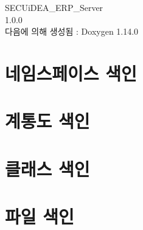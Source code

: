 \documentclass[twoside]{book}
\newcommand{\+}{\discretionary{\mbox{\scriptsize$\hookleftarrow$}}{}{}}
\newcommand{\clearemptydoublepage}{%
    \newpage{\pagestyle{empty}\cleardoublepage}%
  }
\begin{document}
  \raggedbottom
    \hypersetup{pageanchor=false,
                bookmarksnumbered=true,
                pdfencoding=unicode
               }
  \begin{titlepage}
  \vspace*{7cm}
  \begin{center}%
  {\Large SECUi\+DEA\+\_\+\+ERP\+\_\+\+Server}\\
  [1ex]\large 1.\+0.\+0 \\
  \vspace*{1cm}
  {\large 다음에 의해 생성됨 \+:  Doxygen 1.14.0}\\
  \end{center}
  \end{titlepage}
  \clearemptydoublepage
  \tableofcontents
  \clearemptydoublepage
  \hypersetup{pageanchor=true}






\chapter{네임스페이스 색인}

\chapter{계통도 색인}

\chapter{클래스 색인}

\chapter{파일 색인}

\end{document}
